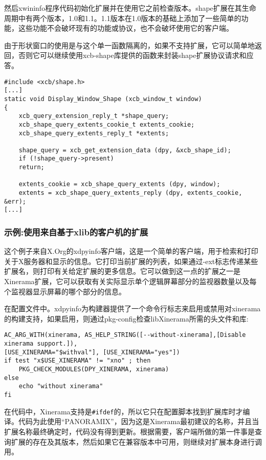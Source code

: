 然后xwininfo程序代码初始化扩展并在使用它之前检查版本。shape扩展在其生命周期中有两个版本，1.0和1.1。1.1版本在1.0版本的基础上添加了一些简单的功能，这些功能不会破坏现有的功能或协议，也不会破坏使用它的客户端。

由于形状窗口的使用是与这个单一函数隔离的，如果不支持扩展，它可以简单地返回，否则它可以继续使用xcb-shape库提供的函数来封装shape扩展协议请求和应答。

\begin{lstlisting}
#include <xcb/shape.h>
[...]
static void Display_Window_Shape (xcb_window_t window)
{
	xcb_query_extension_reply_t *shape_query;
	xcb_shape_query_extents_cookie_t extents_cookie;
	xcb_shape_query_extents_reply_t *extents;
	
	shape_query = xcb_get_extension_data (dpy, &xcb_shape_id);
	if (!shape_query->present)
	return;
	
	extents_cookie = xcb_shape_query_extents (dpy, window);
	extents = xcb_shape_query_extents_reply (dpy, extents_cookie, &err);
[...]
\end{lstlisting}

\subsubsection{示例:使用来自基于xlib的客户机的扩展}

这个例子来自X.Org的xdpyinfo客户端，这是一个简单的客户端，用于检索和打印关于X服务器和显示的信息。它打印当前扩展的列表，如果通过-ext标志传递某些扩展名，则打印有关给定扩展的更多信息。它可以做到这一点的扩展之一是Xinerama扩展，它可以获取有关实际显示单个逻辑屏幕部分的监视器数量以及每个监视器显示屏幕的哪个部分的信息。

在配置文件中。xdpyinfo为构建器提供了一个命令行标志来启用或禁用对xinerama的构建支持，如果启用，则通过pkg-config检查libXinerama所需的头文件和库:

\begin{lstlisting}
AC_ARG_WITH(xinerama, AS_HELP_STRING([--without-xinerama],[Disable xinerama support.]),
[USE_XINERAMA="$withval"], [USE_XINERAMA="yes"])
if test "x$USE_XINERAMA" != "xno" ; then
	PKG_CHECK_MODULES(DPY_XINERAMA, xinerama)
else
	echo "without xinerama"
fi
\end{lstlisting}

在代码中，Xinerama支持是\lstinline|#ifdef|的，所以它只在配置脚本找到扩展库时才编译。代码为此使用“PANORAMIX”，因为这是Xinerama最初建议的名称，并且当扩展名称最终确定时，代码没有得到更新。根据需要，客户端所做的第一件事是查询扩展的存在及其版本，然后如果它在兼容版本中可用，则继续对扩展本身进行调用。

